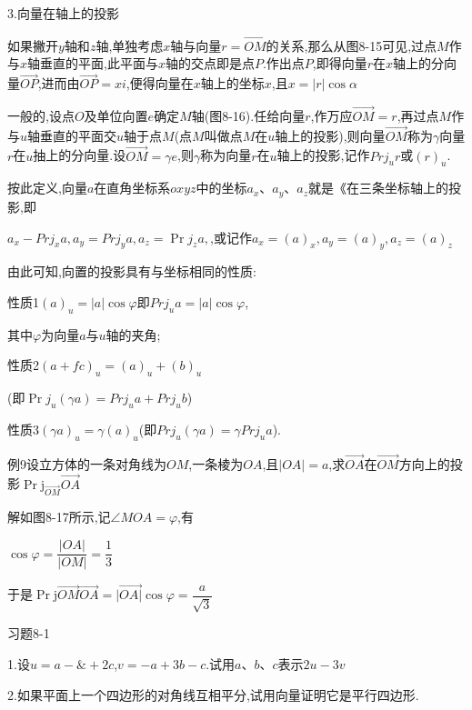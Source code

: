 \documentclass[oneside]{book}
\begin{document}
3.向量在轴上的投影

如果撇开$y$轴和$z$轴,单独考虑$x$轴与向量$r = \overrightarrow {OM} $的关系,那么从图8-15可见,过点$M$作与$x$轴垂直的平面,此平面与$x$轴的交点即是点$P$.作出点$P$,即得向量$r$在$x$轴上的分向量$\overrightarrow {OP} $,进而由$\overrightarrow {OP}  = xi$,便得向量在$x$轴上的坐标$x$,且$x = |r|\cos\alpha $

一般的,设点$O$及单位向置$e$确定$M$轴(图8-16).任给向量$r$,作万应$\overrightarrow {OM}  = r$,再过点$M$作与$u$轴垂直的平面交$u$轴于点$M$(点$M$叫做点$M$在$u$轴上的投影),则向量$\overrightarrow {OM}$称为$\gamma $向量$r$在$u$抽上的分向量.设$\overrightarrow {OM}  = \gamma e$,则$\gamma $称为向量$r$在$u$轴上的投影,记作$Pr{j_u}r$或${(r)_u}$.

按此定义,向量$a$在直角坐标系$oxyz$中的坐标${a_x}$、${a_y}$、${a_z}$就是《在三条坐标轴上的投影,即

${a_x} - Pr{j_x}a,{a_y} = Pr{j_y}a,{a_z} = \Pr {j_z}a,$,或记作${a_x} = {\left( a \right)_x},{a_y} = {\left( a \right)_y},{a_z} = {\left( a \right)_z}$

由此可知,向置的投影具有与坐标相同的性质:

性质1${\left( a \right)_u} = \left| a \right|\cos\varphi $即$Pr{j_u}a = |a|\cos \varphi $,

其中$\varphi $为向量$a$与$u$轴的夹角;

性质2${\left( {a + fc} \right)_u} = {\left( a \right)_u} + {\left( b \right)_u}$

(即$\Pr {j_u}\left( {\gamma a} \right) = Pr{j_u}a + Pr{j_u}b$)

性质3${\left( {\gamma a} \right)_u} = \gamma {\left( a \right)_u}$(即$Pr{j_u}\left( {\gamma a} \right) = \gamma Pr{j_u}a$).

例9设立方体的一条对角线为$OM$,一条棱为$OA$,且$\left| {OA} \right| = a$,求$\overrightarrow {OA} $在$\overrightarrow {OM} $方向上的投影$\Pr {{\text{j}}_{\overrightarrow {OM} }}\overrightarrow {OA} $

解如图8-17所示,记$\angle MOA = \varphi $,有

$\cos \varphi  = \dfrac{{|OA|}}{{|OM|}} = \dfrac{1}{3}$

于是$\Pr {\text{j}}\overrightarrow {OM} \overrightarrow {OA}  = |\overrightarrow {OA|} \cos \varphi  = \dfrac{a}{{\sqrt 3 }}$

习题8-1

1.设$u = a - \&  + 2c$,$v =  - a + 3b - c$.试用$a$、$b$、$c$表示$2u - 3v$

2.如果平面上一个四边形的对角线互相平分,试用向量证明它是平行四边形.
\end{document}
